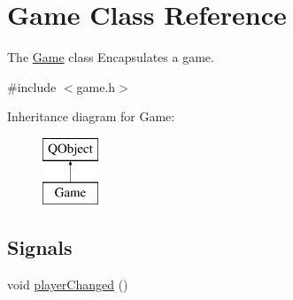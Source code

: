 \hypertarget{class_game}{\section{Game Class Reference}
\label{class_game}
}


The \hyperlink{class_game}{Game} class Encapsulates a game.  




{\ttfamily \#include $<$game.\-h$>$}

Inheritance diagram for Game\-:\begin{figure}[H]
\begin{center}
\leavevmode
\includegraphics[height=2.000000cm]{class_game}
\end{center}
\end{figure}
\subsection*{Signals}
\begin{DoxyCompactItemize}
\item 
void \hyperlink{class_game_a7c8ac8994a4a829de95544268ada916e}{player\-Changed} ()
\end{DoxyCompactItemize}
